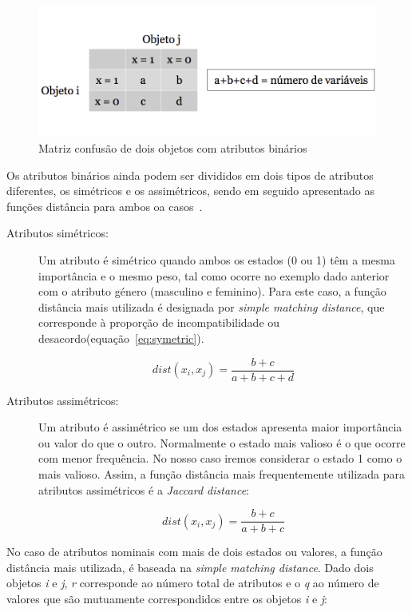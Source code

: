 \begin{figure}[h]
\centering
\includegraphics[width=0.8\linewidth]{./figures/matriz_confusao}
\caption{Matriz confusão de dois objetos com atributos binários}
\label{fig:matriz_confusão}
\end{figure}


Os atributos binários ainda podem ser divididos em dois tipos de atributos diferentes, os simétricos e os assimétricos, sendo em seguido apresentado as funções distância para ambos oa casos~\citet{Liu2011}.

\begin{description}
\item[Atributos simétricos: ] Um atributo é simétrico quando ambos os estados (0 ou 1) têm a mesma importância e o mesmo peso, tal como ocorre no exemplo dado anterior com o atributo género (masculino e feminino). Para este caso, a função distância mais utilizada é designada por \textit{simple matching distance}, que corresponde à proporção de incompatibilidade ou desacordo(equação~\ref{eq:symetric}).  

\begin{equation}
 dist(x_{i}, x_{j}) =  \frac{b + c}{a + b + c + d}
 \label{eq:symetric}   
\end{equation}

\item[Atributos assimétricos: ] Um atributo é assimétrico se um dos estados apresenta maior importância ou valor do que o outro. Normalmente o estado mais valioso é o que ocorre com menor frequência. No nosso caso iremos considerar o estado 1 como o mais valioso. Assim, a função distância mais frequentemente utilizada para atributos assimétricos é a \textit{Jaccard distance}:

\begin{equation}
 dist(x_{i}, x_{j}) =  \frac{b + c}{a + b + c}
\label{eq:asymetric}   
\end{equation}

\end{description}

No caso de atributos nominais com mais de dois estados ou valores, a função distância mais utilizada, é baseada na \textit{simple matching distance}. Dado dois objetos \textit{i} e \textit{j}, \textit{r} corresponde ao número total de atributos e o \textit{q} ao número de valores que são mutuamente correspondidos entre os objetos \textit{i} e \textit{j}:

